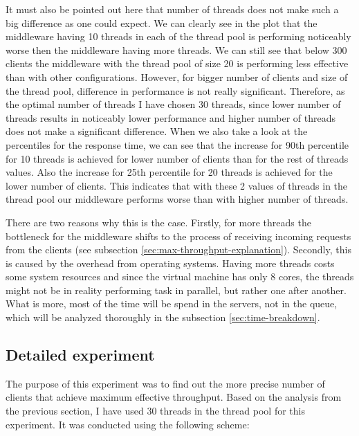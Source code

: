 \documentclass[11pt]{article}
\begin{document}
It must also be pointed out here that number of threads does not make such a big difference as one could expect. We can clearly see in the plot that the middleware having 10 threads in each of the thread pool is performing noticeably worse then the middleware having more threads. We can still see that below 300 clients the middleware with the thread pool of size 20 is performing less effective than with other configurations. However, for bigger number of clients and size of the thread pool, difference in performance is not really significant. Therefore, as the optimal number of threads I have chosen 30 threads, since lower number of threads results in noticeably lower performance and higher number of threads does not make a significant difference. When we also take a look at the percentiles for the response time, we can see that the increase for 90th percentile for 10 threads is achieved for lower number of clients than for the rest of threads values. Also the increase for 25th percentile for 20 threads is achieved for the lower number of clients. This indicates that with these 2 values of threads in the thread pool our middleware performs worse than with higher number of threads.

There are two reasons why this is the case. Firstly, for more threads the bottleneck for the middleware shifts to the process of receiving incoming requests from the clients (see subsection \ref{sec:max-throughput-explanation}).  Secondly, this is caused by %
the overhead from operating systems. Having more threads costs some system resources and since the virtual machine has only 8 cores, the threads might not be in reality performing task in parallel, but rather one after another. What is more, most of the time will be spend in the servers, not in the queue, which will be analyzed thoroughly in the subsection \ref{sec:time-breakdown}.

\subsection{Detailed experiment}

The purpose of this experiment was to find out the more precise number of clients that achieve maximum effective throughput. Based on the analysis from the previous section, I have used 30 threads in the thread pool for this experiment. It was conducted using the following scheme:
\medskip
\end{document}
